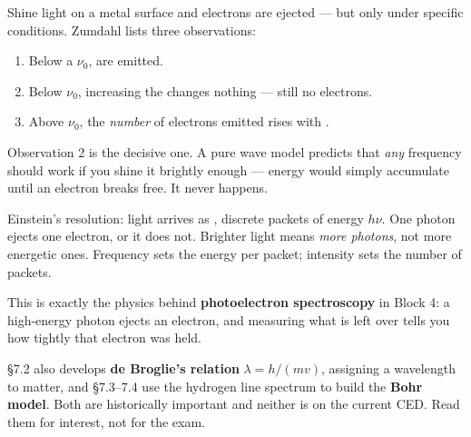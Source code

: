 \documentclass{apchem-notes}
\begin{document}


Shine light on a metal surface and electrons are ejected --- but only under
specific conditions. Zumdahl lists three observations:

\begin{enumerate}[leftmargin=*,itemsep=0.2em]
  \item Below a  $\nu_0$,
         are emitted.
  \item Below $\nu_0$, increasing the 
        changes nothing --- still no electrons.
  \item Above $\nu_0$, the \emph{number} of electrons emitted rises with
        .
\end{enumerate}

\begin{apcnote}
Observation 2 is the decisive one. A pure wave model predicts that
\emph{any} frequency should work if you shine it brightly enough --- energy
would simply accumulate until an electron breaks free. It never happens.

Einstein's resolution: light arrives as , discrete packets of
energy $h\nu$. One photon ejects one electron, or it does not. Brighter
light means \emph{more photons}, not more energetic ones. Frequency sets
the energy per packet; intensity sets the number of packets.
\end{apcnote}

This is exactly the physics behind \textbf{photoelectron spectroscopy} in
Block 4: a high-energy photon ejects an electron, and measuring what is left
over tells you how tightly that electron was held.

\begin{apcnote}
\S7.2 also develops \textbf{de Broglie's relation} $\lambda = h/(mv)$,
assigning a wavelength to matter, and \S7.3--7.4 use the hydrogen line
spectrum to build the \textbf{Bohr model}. Both are historically important
and neither is on the current CED. Read them for interest, not for the
exam.
\end{apcnote}

\end{document}
